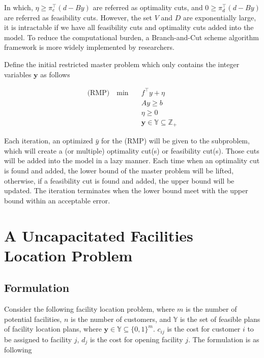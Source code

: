        In which, $\eta \ge \pi_e^\top (d - By)$ are referred as optimality cuts, and $0 \ge \pi_d^\top (d - By)$ are referred as feasibility cuts. However, the set $V$ and $D$ are exponentially large, it is intractable if we have all feasibility cuts and optimality cuts added into the model. To reduce the computational burden, a Branch-and-Cut scheme algorithm framework is more widely implemented by researchers.

        Define the initial restricted master problem which only contains the integer variables $\mathbf{y}$ as follows

        \begin{align*}
            \text{(RMP)} \quad \min \quad &f^\top y + \eta\\
            & Ay \ge b \\
            & \eta \ge 0 \\
            & \mathbf{y} \in \mathbb{Y} \subseteq \mathbb{Z}_+
        \end{align*}

        Each iteration, an optimized $\bar{y}$ for the (RMP) will be given to the subproblem, which will create a (or multiple) optimality cut(s) or feasibility cut(s). Those cuts will be added into the model in a lazy manner. Each time when an optimality cut is found and added, the lower bound of the master problem will be lifted, otherwise, if a feasibility cut is found and added, the upper bound will be updated. The iteration terminates when the lower bound meet with the upper bound within an acceptable error.

    \section{A Uncapacitated Facilities Location Problem}
        \subsection{Formulation}
            Consider the following facility location problem, where $m$ is the number of potential facilities, $n$ is the number of customers, and $\mathbb{Y}$ is the set of feasible plans of facility location plans, where $\mathbf{y} \in \mathbb{Y} \subseteq \{0, 1\}^m$. $c_{ij}$ is the cost for customer $i$ to be assigned to facility $j$, $d_j$ is the cost for opening facility $j$. The formulation is as following
            
